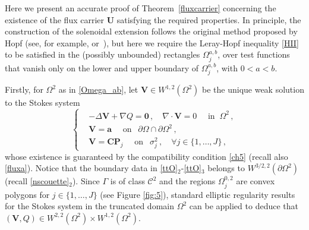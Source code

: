 \documentclass[11pt]{article}
\numberwithin{equation}{section}
\numberwithin{figure}{section}
\def\0{{\mathbf 0}}
\def\ae{{\mathbf a}}
\begin{document}
Here we present an accurate proof of Theorem~\ref{fluxcarrier} concerning the existence of the flux carrier $\mathbf U$ satisfying the required properties. 
In principle, the construction of the solenoidal extension follows the original method proposed by Hopf (see, for example,
\cite[Lemma IX.4.2]{galdi2011introduction} or \cite[Lemma 3.3.1]{korobkov2024steady}\,), but here we require the Leray-Hopf inequality
\eqref{HII} to be satisfied in the (possibly unbounded) rectangles $\Omega^{a,b}_{j}$, over test functions that vanish only on the lower
and upper boundary of $\Omega^{a,b}_{j}$, with $0<a<b$.\par
Firstly, for $\Omega^2$ as in \eqref{Omega_ab}, let $\mathbf{V} \in W^{1,2}(\Omega^2)$ be the unique weak solution
to the Stokes system
\begin{equation}\label{ttO}
\left\{
\begin{aligned}
&- \Delta \mathbf{V}  + \nabla Q = \0 \, , \quad\nabla \cdot \mathbf{V} = 0 \quad\mbox{ in } \ \Omega^2 \, , \\[6pt]
& \mathbf{V} = \ae \quad \mbox{ on } \ \ \partial\Omega\cap \partial \Omega^2 \, , \\[6pt]
& \mathbf{V} = \mathbf{CP}_j \quad \mbox{ on } \ \ {\sigma^{2}_{j}}  \, , \quad \forall j \in \{1,\dots, J\} \, ,
\end{aligned}
\right.
\end{equation}
whose existence is guaranteed by the compatibility condition \eqref{ch5} (recall also \eqref{fluxa}). Notice that the boundary data in \eqref{ttO}$_2$-\eqref{ttO}$_3$ belongs to $W^{3/2,2}(\partial\Omega^2)$ (recall \eqref{nscouette}$_2$). Since $\Gamma$ is of class $\mathcal{C}^{2}$ and the regions $\Omega_j^{0,2}$ are convex polygons for $j \in \{1,\dots, J\}$ (see Figure \ref{fig:5}), standard elliptic regularity results for the Stokes system \cite[Theorem 1]{kellogg1976regularity} in the truncated domain $\Omega^2$ can be applied to deduce that $(\mathbf{V},Q) \in W^{2,2}(\Omega^2) \times W^{1,2}(\Omega^2)$.
\end{document}
